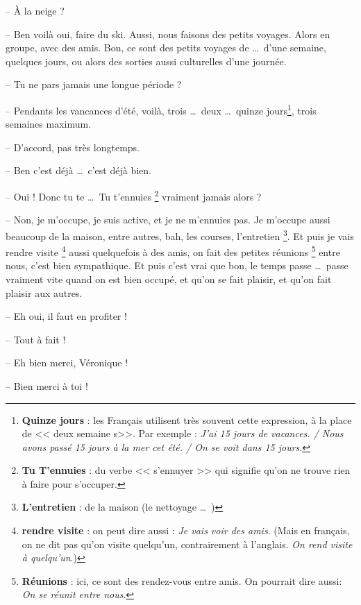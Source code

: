 \documentclass[11pt, french]{report}
\begin{document}
-- À la neige ?

-- Ben voilà oui, faire du ski. Aussi, nous faisons des petits voyages. Alors
en groupe, avec des amis. Bon, ce sont des petits voyages de \ldots\ d'une
semaine, quelques jours, ou alors des sorties aussi culturelles d'une journée.

-- Tu ne pars jamais une longue période ?

-- Pendants les vancances d'été, voilà, trois \ldots\ deux \ldots\ quinze
jours\footnote{\textbf{Quinze jours} : les Français utilisent très souvent
  cette expression, à la place de << deux semaine s>>. Par exemple :
  \textit{J'ai 15 jours de vacances. / Nous avons passé 15 jours à la mer
    cet été. / On se voit dans 15 jours}.}, trois semaines maximum.

-- D'accord, pas très longtemps.

-- Ben c'est déjà \ldots\ c'est déjà bien.

-- Oui ! Donc tu te \ldots\ Tu t'ennuies \footnote{\textbf{Tu T'ennuies} : du
  verbe << s'ennuyer >> qui signifie qu'on ne trouve rien à faire pour
  s'occuper.} vraiment jamais alors ?

-- Non, je m'occupe, je suis active, et je ne m'ennuies pas. Je m'occupe aussi
beaucoup de la maison, entre autres, bah, les courses, l'entretien
\footnote{\textbf{L'entretien} : de la maison (le nettoyage \ldots\ )}.
Et puis je vais rendre visite \footnote{\textbf{rendre visite} : on peut
  dire aussi : \textit{Je vais voir des amis}. (Mais en français, on ne dit pas
  qu'on visite quelqu'un, contrairement à l'anglais. \textit{On rend visite
    à quelqu'un}.)} aussi quelquefois à des amis, on fait des petites
réunions \footnote{\textbf{Réunions} : ici, ce sont des rendez-vous entre
  amis. On pourrait dire aussi: \textit{On se réunit entre nous}.} entre nous,
c'est bien sympathique. Et puis c'est vrai que bon, le temps passe \ldots\
passe vraiment vite quand on est bien occupé, et qu'on se fait plaisir, et qu'on
fait plaisir aux autres.

-- Eh oui, il faut en profiter !

-- Tout à fait !

-- Eh bien merci, Véronique !

-- Bien merci à toi !
\end{document}
